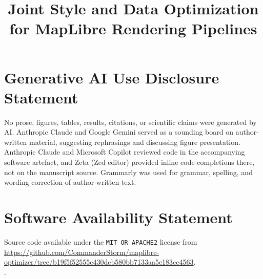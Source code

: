 \documentclass[]{interact}
\theoremstyle{plain}%
\theoremstyle{definition}
\theoremstyle{remark}
\begin{document}

\title{Joint Style and Data Optimization for MapLibre Rendering Pipelines}

\maketitle

\author{
}


\acresetall %









\section*{Generative AI Use Disclosure Statement}
No prose, figures, tables, results, citations, or scientific claims were generated by AI.
Anthropic Claude and Google Gemini served as a sounding board on author-written material,
suggesting rephrasings and discussing figure presentation. Anthropic Claude and Microsoft
Copilot reviewed code in the accompanying software artefact, and Zeta (Zed editor) provided
inline code completions there, not on the manuscript source. Grammarly was used for grammar,
spelling, and wording correction of author-written text.

\section*{Software Availability Statement}
Source code available under the \texttt{MIT OR APACHE2} license from \url{https://github.com/CommanderStorm/maplibre-optimizer/tree/b19f5f52555c430dcb580bb7133aa5c183cc4563}.\\
.



\end{document}
